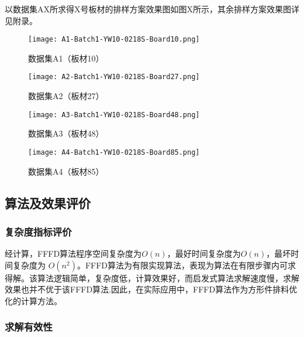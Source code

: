 \documentclass[bwprint]{gmcmthesis}
\begin{document}
        以数据集AX所求得X号板材的排样方案效果图如图X所示，其余排样方案效果图详见附录。
        \begin{figure}[!htbp]
            \centering
            \begin{minipage}{0.48\linewidth}
                \centering
                \texttt{[image: A1-Batch1-YW10-0218S-Board10.png]}
                \caption{数据集A1（板材10）}
            \end{minipage}
            \begin{minipage}{0.48\linewidth}
                \centering
                \texttt{[image: A2-Batch1-YW10-0218S-Board27.png]}
                \caption{数据集A2（板材27）}
            \end{minipage}
        \end{figure}
        \begin{figure}[!htbp]
            \centering
            \begin{minipage}{0.48\linewidth}
                \centering
                \texttt{[image: A3-Batch1-YW10-0218S-Board48.png]}
                \caption{数据集A3（板材48）}
            \end{minipage}
            \begin{minipage}{0.48\linewidth}
                \centering
                \texttt{[image: A4-Batch1-YW10-0218S-Board85.png]}
                \caption{数据集A4（板材85）}
            \end{minipage}
        \end{figure}
	

\subsection{算法及效果评价}

\subsubsection{复杂度指标评价}  

经计算，FFFD算法程序空间复杂度为$O(n)$，最好时间复杂度为$O(n)$，最坏时间复杂度为 $ O(n^2) $。FFFD算法为有限实现算法，表现为算法在有限步骤内可求得解。该算法逻辑简单，复杂度低，计算效果好，而启发式算法求解速度慢，求解效果也并不优于该FFFD算法.因此，在实际应用中，FFFD算法作为方形件排料优化的计算方法。


\subsubsection{求解有效性}
	
\end{document}
